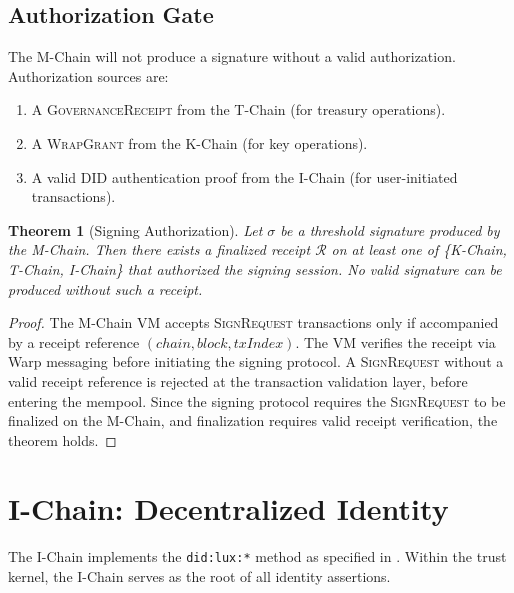 \documentclass[11pt,a4paper]{article}
\newtheorem{theorem}{Theorem}[section]
\begin{document}
\subsection{Authorization Gate}

The M-Chain will not produce a signature without a valid authorization. Authorization
sources are:

\begin{enumerate}
    \item A \textsc{GovernanceReceipt} from the T-Chain (for treasury operations).
    \item A \textsc{WrapGrant} from the K-Chain (for key operations).
    \item A valid DID authentication proof from the I-Chain (for user-initiated
          transactions).
\end{enumerate}

\begin{theorem}[Signing Authorization]\label{thm:signing-auth}
Let $\sigma$ be a threshold signature produced by the M-Chain. Then there exists
a finalized receipt $\mathcal{R}$ on at least one of \{K-Chain, T-Chain, I-Chain\}
that authorized the signing session. No valid signature can be produced without
such a receipt.
\end{theorem}

\begin{proof}
The M-Chain VM accepts \textsc{SignRequest} transactions only if accompanied by
a receipt reference $(chain, block, txIndex)$. The VM verifies the receipt via
Warp messaging \cite{lux-warp-messaging} before initiating the signing protocol.
A \textsc{SignRequest} without a valid receipt reference is rejected at the
transaction validation layer, before entering the mempool. Since the signing
protocol requires the \textsc{SignRequest} to be finalized on the M-Chain,
and finalization requires valid receipt verification, the theorem holds.
\end{proof}

\section{I-Chain: Decentralized Identity}\label{sec:ichain}

The I-Chain implements the \texttt{did:lux:*} method as specified in
\cite{lux-id-did-specification}. Within the trust kernel, the I-Chain serves
as the root of all identity assertions.
\end{document}
